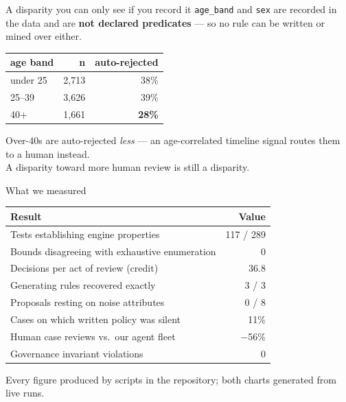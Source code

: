 \documentclass[aspectratio=169,11pt]{beamer}
\begin{document}
\begin{frame}{A disparity you can only see if you record it}
  \vspace{1em}
  \texttt{age\_band} and \texttt{sex} are recorded in the data and are
  \textbf{not declared predicates} --- so no rule can be written or mined over
  either.
  \vspace{1.2em}
  \begin{center}
  \begin{tabular}{lrr}
    \toprule
    \textbf{age band} & \textbf{n} & \textbf{auto-rejected} \\
    \midrule
    under 25 & 2,713 & 38\% \\
    25--39   & 3,626 & 39\% \\
    40+      & 1,661 & \textbf{28\%} \\
    \bottomrule
  \end{tabular}
  \end{center}
  \vspace{1em}
  \pause
  \begin{center}\color{muted}
    Over-40s are auto-rejected \emph{less} --- an age-correlated timeline signal
    routes them to a human instead.\\
    A disparity toward more human review is still a disparity.
  \end{center}
\end{frame}

\begin{frame}{What we measured}
  \vspace{1em}
  \begin{center}
  \begin{tabular}{lr}
    \toprule
    \textbf{Result} & \textbf{Value} \\
    \midrule
    Tests establishing engine properties & 117 / 289 \\
    Bounds disagreeing with exhaustive enumeration & 0 \\
    Decisions per act of review (credit) & 36.8 \\
    Generating rules recovered exactly & 3 / 3 \\
    Proposals resting on noise attributes & 0 / 8 \\
    Cases on which written policy was silent & 11\% \\
    Human case reviews vs.\ our agent fleet & $-$56\% \\
    Governance invariant violations & 0 \\
    \bottomrule
  \end{tabular}
  \end{center}
  \vspace{1.2em}
  \begin{center}\color{muted}\small
    Every figure produced by scripts in the repository; both charts generated
    from live runs.
  \end{center}
\end{frame}
\end{document}
